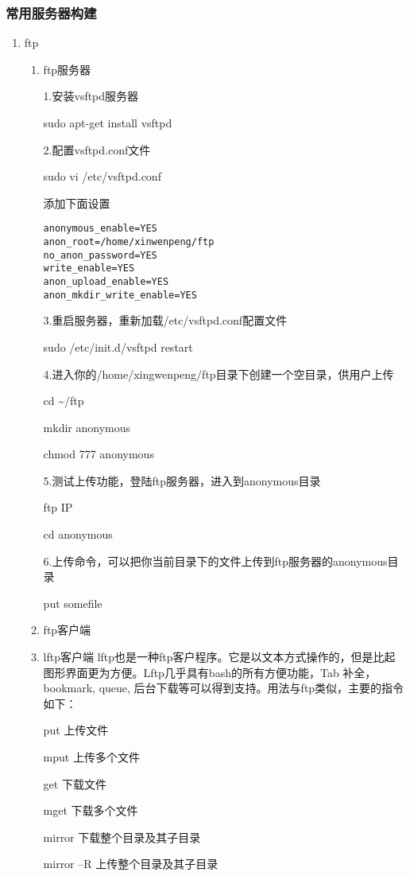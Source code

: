\documentclass[11pt]{article}
\begin{document}
\subsubsection{常用服务器构建}
\label{sec-1-1-12}
\begin{enumerate}
\item ftp
\label{sec-1-1-12-1}
\begin{enumerate}
\item ftp服务器
\label{sec-1-1-12-1-1}

1.安装vsftpd服务器

sudo apt-get install vsftpd

2.配置vsftpd.conf文件

sudo vi /etc/vsftpd.conf

添加下面设置
\begin{verbatim}
anonymous_enable=YES
anon_root=/home/xinwenpeng/ftp
no_anon_password=YES
write_enable=YES
anon_upload_enable=YES
anon_mkdir_write_enable=YES
\end{verbatim}
3.重启服务器，重新加载/etc/vsftpd.conf配置文件

sudo /etc/init.d/vsftpd restart

4.进入你的/home/xingwenpeng/ftp目录下创建一个空目录，供用户上传

cd \textasciitilde{}/ftp

mkdir anonymous

chmod 777 anonymous

5.测试上传功能，登陆ftp服务器，进入到anonymous目录

ftp  IP

cd anonymous

6.上传命令，可以把你当前目录下的文件上传到ftp服务器的anonymous目录

put  somefile

\item ftp客户端
\label{sec-1-1-12-1-2}
\item lftp客户端
\label{sec-1-1-12-1-3}
lftp也是一种ftp客户程序。它是以文本方式操作的，但是比起图形界面更为方便。Lftp几乎具有bash的所有方便功能，Tab 补全，bookmark, queue, 后台下载等可以得到支持。用法与ftp类似，主要的指令如下： 

put 上传文件 

mput 上传多个文件 

get 下载文件 

mget 下载多个文件 

mirror 下载整个目录及其子目录 

mirror –R 上传整个目录及其子目录 


\end{enumerate}
\end{enumerate}
\end{document}
